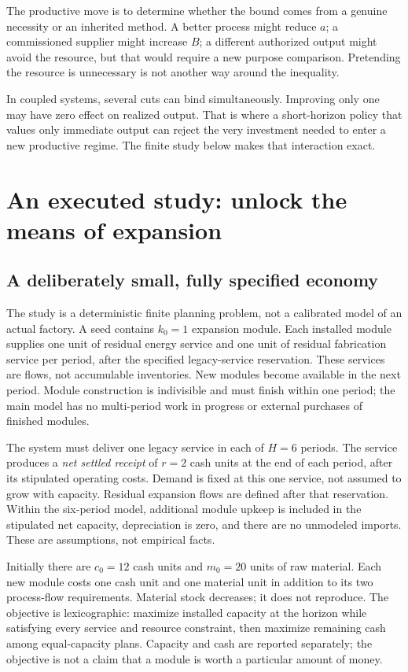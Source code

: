 \documentclass[11pt,letterpaper]{article}
\newcommand{\1}{\mathbf 1}
\theoremstyle{remark}\newtheorem{remark}{Remark}[section]
\begin{document}
The productive move is to determine whether the bound comes from a genuine necessity or an inherited method. A better process might reduce $a$; a commissioned supplier might increase $B$; a different authorized output might avoid the resource, but that would require a new purpose comparison. Pretending the resource is unnecessary is not another way around the inequality.

In coupled systems, several cuts can bind simultaneously. Improving only one may have zero effect on realized output. That is where a short-horizon policy that values only immediate output can reject the very investment needed to enter a new productive regime. The finite study below makes that interaction exact.

\section{An executed study: unlock the means of expansion}\label{sec:study}
\subsection{A deliberately small, fully specified economy}
The study is a deterministic finite planning problem, not a calibrated model of an actual factory. A seed contains $k_0=1$ expansion module. Each installed module supplies one unit of residual energy service and one unit of residual fabrication service per period, after the specified legacy-service reservation. These services are flows, not accumulable inventories. New modules become available in the next period. Module construction is indivisible and must finish within one period; the main model has no multi-period work in progress or external purchases of finished modules.

The system must deliver one legacy service in each of $H=6$ periods. The service produces a \emph{net settled receipt} of $r=2$ cash units at the end of each period, after its stipulated operating costs. Demand is fixed at this one service, not assumed to grow with capacity. Residual expansion flows are defined after that reservation. Within the six-period model, additional module upkeep is included in the stipulated net capacity, depreciation is zero, and there are no unmodeled imports. These are assumptions, not empirical facts.

Initially there are $c_0=12$ cash units and $m_0=20$ units of raw material. Each new module costs one cash unit and one material unit in addition to its two process-flow requirements. Material stock decreases; it does not reproduce. The objective is lexicographic: maximize installed capacity at the horizon while satisfying every service and resource constraint, then maximize remaining cash among equal-capacity plans. Capacity and cash are reported separately; the objective is not a claim that a module is worth a particular amount of money.
\end{document}
